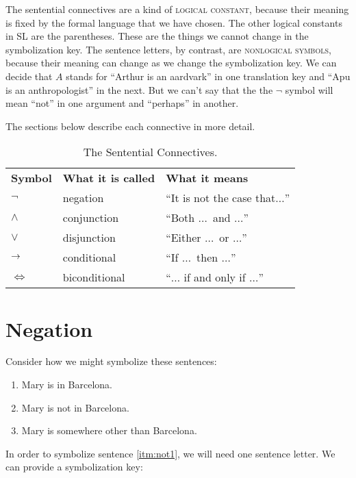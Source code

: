 The sentential connectives are a kind of \textsc{\gls{logical constant}},\label{def:logical_constant} because their meaning is fixed by the formal language that we have chosen. The other logical constants in SL are the parentheses. These are the things we cannot change in the symbolization key. The sentence letters, by contrast, are \textsc{\glspl{nonlogical symbol}}, \label{def:nonlogical_symbol} because their meaning can change as we change the symbolization key. We can decide that $A$ stands for ``Arthur is an aardvark'' in one translation key and ``Apu is an anthropologist'' in the next. But we can't say that the  the $\lnot$ symbol will mean ``not'' in one argument and ``perhaps'' in another.

The sections below describe each connective in more detail.

\begin{table}
\begin{tabu}{X[1,c] X[3,c] X[3,c]}
\textbf{Symbol} & \textbf{What it is called} & \textbf{What it means}\\
$\lnot$   & negation&      ``It is not the case that$\ldots$''\\
$\land$   & conjunction&   ``Both $\ldots$\ and $\ldots$''\\
$\lor$    & disjunction&   ``Either $\ldots$\ or $\ldots$''\\
$\mathrel{\rightarrow}$ & conditional&   ``If $\ldots$\ then $\ldots$''\\
$\iff$    & biconditional& ``$\ldots$ if and only if $\ldots$''\\
\end{tabu}
\caption{The Sentential Connectives.}
\label{table:sentential_connectives}
\end{table}

\section{Negation}
Consider how we might symbolize these sentences:

\begin{enumerate}
\item Mary is in Barcelona. \label{itm:not1}
\item Mary is not in Barcelona. \label{itm:not2}
\item Mary is somewhere other than Barcelona. \label{itm:not3}
\end{enumerate}

In order to symbolize sentence \ref{itm:not1}, we will need one sentence letter. We can provide a symbolization key:

